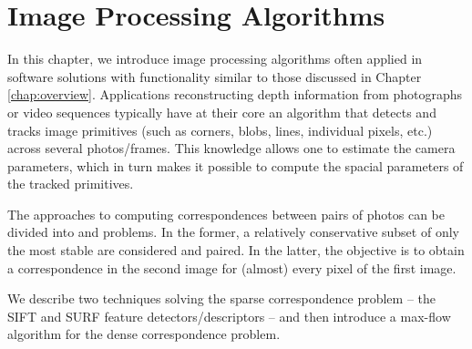 
\chapter{Image Processing Algorithms}
\label{chap:algorithms}

In this chapter, we introduce image processing algorithms often applied in software solutions with functionality similar to those discussed in Chapter \ref{chap:overview}. %
Applications reconstructing depth information from photographs or video sequences typically have at their core an algorithm that detects and tracks image primitives (such as corners, blobs, lines, individual pixels, etc.) across several photos/frames. 
This knowledge allows one to estimate the camera parameters, which in turn makes it possible to compute the spacial parameters of the tracked primitives.

The approaches to computing correspondences between pairs of photos can be divided into  and  problems. %
In the former, a relatively conservative subset of only the most stable  are considered and paired. %
In the latter, the objective is to obtain a correspondence in the second image for (almost) every pixel of the first image. 

We describe two techniques solving the sparse correspondence problem -- the SIFT \cite{lowe1999} and SURF \cite{surf2006} feature detectors/descriptors -- and then introduce a max-flow algorithm \cite{roy1999} for the dense correspondence problem. %

